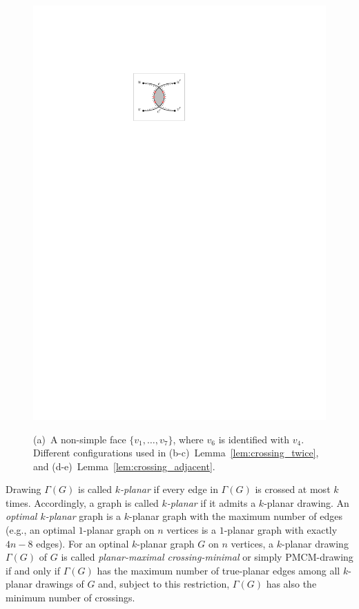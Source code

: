 \begin{figure}[tb]
\begin{minipage}[b]{.18\textwidth}
        \includegraphics[width=\textwidth,page=4]{images/crossing_conf}
        \subcaption{~}\label{fig:crossing_adjacent_2}
    \end{minipage}	
    \caption{%
    (a)~A non-simple face $\{v_1,\ldots,v_7\}$, where $v_6$ is identified with $v_4$.
    Different configurations used in 
    (b-c)~Lemma~\ref{lem:crossing_twice}, and 
    (d-e)~Lemma~\ref{lem:crossing_adjacent}.}
    \label{fig:2_planar_polygon_conf}
\end{figure} 

Drawing $\Gamma(G)$ is called \emph{$k$-planar} if every edge in $\Gamma(G)$ is crossed at most $k$ times. Accordingly, a graph is called \emph{$k$-planar} if it admits a $k$-planar drawing. An \emph{optimal $k$-planar} graph is a $k$-planar graph with the maximum number of edges (e.g., an optimal $1$-planar graph on $n$ vertices is a $1$-planar graph with exactly $4n-8$ edges). For an optinal $k$-planar graph $G$ on $n$ vertices, a $k$-planar drawing $\Gamma(G)$ of $G$ is called \emph{planar-maximal crossing-minimal} or simply PMCM-drawing if and only if $\Gamma(G)$ has the maximum number of true-planar edges among all $k$-planar drawings of $G$ and, subject to this restriction, $\Gamma(G)$ has also the minimum number of crossings.

